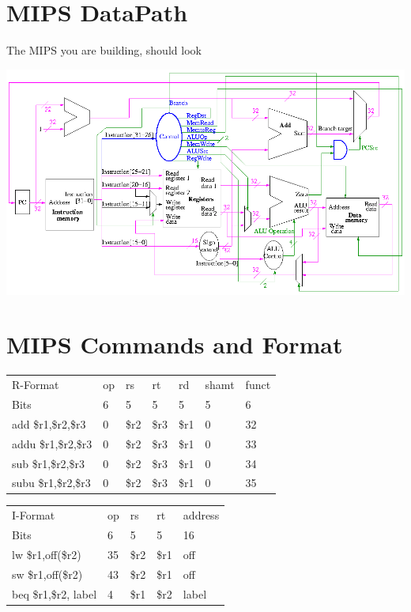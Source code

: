 \section{MIPS DataPath}
The MIPS you are building, should look 

\includegraphics[width=\textwidth]{images/pipeline.png}


\section{MIPS Commands and Format}
\noindent
\begin{tabular}{p{1.25in}|p{.35in}|p{.35in}|p{.35in}|p{.35in}|p{.35in}|p{.35in}|}
  \cline{2-7}
  R-Format            & op & rs   & rt   & rd   & shamt & funct \\ \cline{2-7}
  Bits                & 6  & 5    & 5    & 5    & 5     & 6     \\ \cline{2-7}
  add \$r1,\$r2,\$r3  & 0  & \$r2 & \$r3 & \$r1 & 0     & 32    \\ \cline{2-7}
  addu \$r1,\$r2,\$r3 & 0  & \$r2 & \$r3 & \$r1 & 0     & 33    \\ \cline{2-7}
  sub \$r1,\$r2,\$r3  & 0  & \$r2 & \$r3 & \$r1 & 0     & 34    \\ \cline{2-7}
  subu \$r1,\$r2,\$r3 & 0  & \$r2 & \$r3 & \$r1 & 0     & 35    \\ \cline{2-7}
\end{tabular}

\vspace{.1in}\noindent
\begin{tabular}{p{1.25in}|p{.35in}|p{.35in}|p{.35in}|p{1.38in}|}
  \cline{2-5}
  I-Format             & op & rs   & rt   & address \\ \cline{2-5}
  Bits                 & 6  & 5    & 5    & 16      \\ \cline{2-5}
  lw \$r1,off(\$r2)    & 35 & \$r2 & \$r1 & off     \\ \cline{2-5}
  sw \$r1,off(\$r2)    & 43 & \$r2 & \$r1 & off     \\ \cline{2-5}
  beq \$r1,\$r2, label & 4  & \$r1 & \$r2 & label   \\ \cline{2-5}
\end{tabular}


